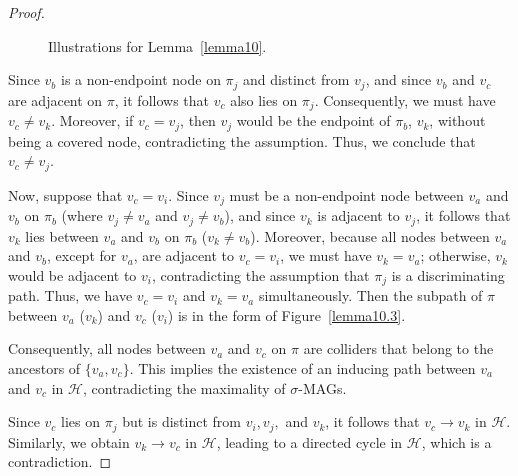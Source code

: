 \documentclass[accepted]{uai2025} %
\begin{document}
\begin{proof}
\begin{figure}[t]
    \caption{Illustrations for Lemma~\ref{lemma10}.}
\end{figure}

Since \( v_b \) is a non-endpoint node on \( \pi_j \) and distinct from \( v_j \), and since \( v_b \) and \( v_c \) are adjacent on \( \pi \), it follows that \( v_c \) also lies on \( \pi_j \). Consequently, we must have \( v_c \neq v_k \). Moreover, if \( v_c = v_j \), then \( v_j \) would be the endpoint of \( \pi_b \), $v_k$, without being a covered node, contradicting the assumption. Thus, we conclude that \( v_c \neq v_j \).  

Now, suppose that \( v_c = v_i \). Since \( v_j \) must be a non-endpoint node between \( v_a \) and \( v_b \) on \( \pi_b \) (where \( v_j \neq v_a \) and \( v_j \neq v_b \)), and since \( v_k \) is adjacent to \( v_j \), it follows that \( v_k \) lies between \( v_a \) and \( v_b \) on \( \pi_b \) ($v_k\neq v_b$). Moreover, because all nodes between \( v_a \) and \( v_b \), except for \( v_a \), are adjacent to \( v_c = v_i \), we must have \( v_k = v_a \); otherwise, \( v_k \) would be adjacent to \( v_i \), contradicting the assumption that \( \pi_j \) is a discriminating path. Thus, we have \( v_c = v_i \) and \( v_k = v_a \) simultaneously. Then the subpath of $\pi$ between $v_a$ ($v_k$) and $v_c$ ($v_i$) is in the form of Figure~\ref{lemma10.3}.

Consequently, all nodes between \( v_a \) and \( v_c \) on \( \pi \) are colliders that belong to the ancestors of \( \{v_a, v_c\} \). This implies the existence of an inducing path between \( v_a \) and \( v_c \) in \( \mathcal{H} \), contradicting the maximality of \( \sigma \)-MAGs.  

Since \( v_c \) lies on \( \pi_j \) but is distinct from \( v_i, v_j, \) and \( v_k \), it follows that \( v_c \rightarrow v_k \) in \( \mathcal{H} \). Similarly, we obtain \( v_k \rightarrow v_c \) in \( \mathcal{H} \), leading to a directed cycle in \( \mathcal{H} \), which is a contradiction.
\end{proof}
\end{document}
